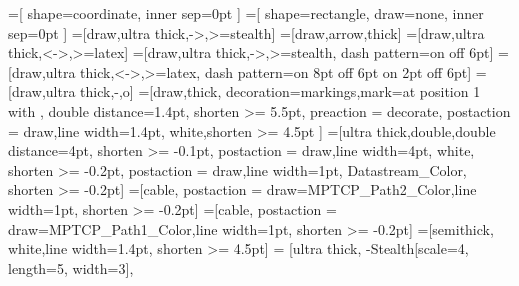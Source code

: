 %
%
=[%
	shape=coordinate,%
	inner sep=0pt%
]%
=[%
	shape=rectangle,%
	draw=none,%
	inner sep=0pt%
]%
%
%
%
%
%
%
%
%
%
%
%
%
=[draw,ultra thick,->,>=stealth]%
=[draw,arrow,thick]%
=[draw,ultra thick,<->,>=latex]%
=[draw,ultra thick,->,>=stealth,
	dash pattern=on \pgflinewidth off 6pt]%
=[draw,ultra thick,<->,>=latex,
	dash pattern=on 8pt off 6pt on 2pt off 6pt]%
=[draw,ultra thick,-,o]%
=[draw,thick, decoration={markings,mark=at position%
    1 with {}},%
    double distance=1.4pt, shorten >= 5.5pt,%
    preaction = {decorate},%
    postaction = {draw,line width=1.4pt, white,shorten >= 4.5pt}%
]%
%
%
%
%
%
%
=[ultra thick,double,double distance=4pt,%
	shorten >= -0.1pt,%
	postaction = {draw,line width=4pt, white, shorten >= -0.2pt},%
	postaction = {draw,line width=1pt, Datastream_Color, shorten >= -0.2pt}]%
=[cable,%
	postaction = {draw=MPTCP_Path2_Color,line width=1pt, shorten >= -0.2pt}]%
=[cable,%
	postaction = {draw=MPTCP_Path1_Color,line width=1pt, shorten >= -0.2pt}]%
=[semithick, white,line width=1.4pt, shorten >= 4.5pt]%
%
%
 = [ultra thick,%
	-{Stealth[scale=4,%
	length=5,%
	width=3]},%
